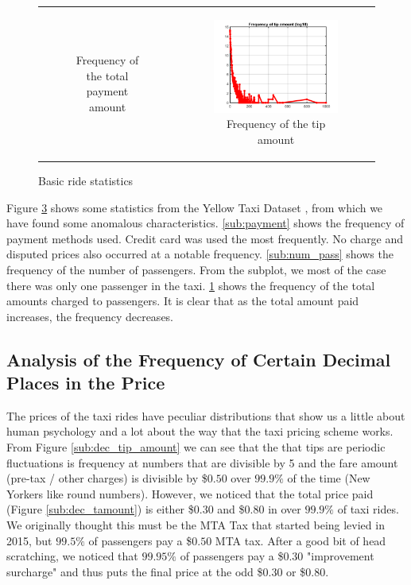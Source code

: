 \documentclass{article}
\begin{document}
\begin{figure}[H]
\begin{tabular}{cc}
\begin{subfigure}{.5\linewidth}
  \caption{Frequency of the total payment amount}
  \label{sub:tamount}%
\end{subfigure} &
\begin{subfigure}{.5\linewidth}
  \centering
  \includegraphics[width=.8\linewidth]{frequency-tipamount}
  \caption{Frequency of the tip amount}
  \label{sub:tip_amount}
\end{subfigure} \\ 

\end{tabular}

\caption{Basic ride statistics}
\label{fig:bstats}
\end{figure}

Figure \ref{fig:bstats} shows some statistics from the Yellow Taxi Dataset \cite{dataset}, from which we have found some anomalous characteristics. \ref{sub:payment} shows the frequency of payment methods used. Credit card was used the most frequently. No charge and disputed prices also occurred at a notable frequency. \ref{sub:num_pass} shows the frequency of the number of passengers. From the subplot, we most of the case there was only one passenger in the taxi. \ref{sub:tamount} shows the frequency of the total amounts charged to passengers. It is clear that as the total amount paid increases, the frequency decreases.

\subsection{Analysis of the Frequency of Certain Decimal Places in the Price}
The prices of the taxi rides have peculiar distributions that show us a little about human psychology and a lot about the way that the taxi pricing scheme works. From Figure \ref{sub:dec_tip_amount} we can see that the that tips are periodic fluctuations is frequency at numbers that are divisible by 5 and the fare amount (pre-tax / other charges) is divisible by \$$0.50$ over $99.9\%$ of the time  (New Yorkers like round numbers). However, we noticed that the total price paid (Figure \ref{sub:dec_tamount}) is either \$$0.30$ and \$$0.80$ in over $99.9\%$ of taxi rides. We originally thought this must be the MTA Tax that started being levied in 2015, but $99.5\%$ of passengers pay a \$$0.50$ MTA tax. After a good bit of head scratching, we noticed that $99.95\%$ of passengers pay a \$$0.30$ "improvement surcharge" and thus puts the final price at the odd \$$0.30$ or \$$0.80$.
\end{document}
